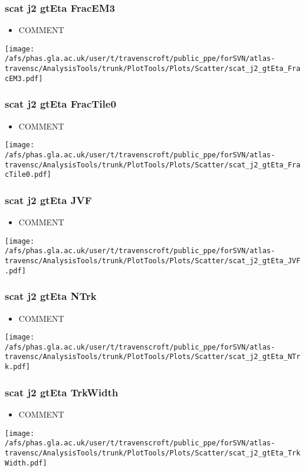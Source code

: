 \documentclass{beamer}
\begin{document}
\begin{frame}
\frametitle{scat j2 gtEta FracEM3}
\begin{itemize}
\item COMMENT
\end{itemize}
\begin{center}
\texttt{[image: /afs/phas.gla.ac.uk/user/t/travenscroft/public\_ppe/forSVN/atlas-travensc/AnalysisTools/trunk/PlotTools/Plots/Scatter/scat\_j2\_gtEta\_FracEM3.pdf]}
\end{center}
\end{frame}

\begin{frame}
\frametitle{scat j2 gtEta FracTile0}
\begin{itemize}
\item COMMENT
\end{itemize}
\begin{center}
\texttt{[image: /afs/phas.gla.ac.uk/user/t/travenscroft/public\_ppe/forSVN/atlas-travensc/AnalysisTools/trunk/PlotTools/Plots/Scatter/scat\_j2\_gtEta\_FracTile0.pdf]}
\end{center}
\end{frame}

\begin{frame}
\frametitle{scat j2 gtEta JVF}
\begin{itemize}
\item COMMENT
\end{itemize}
\begin{center}
\texttt{[image: /afs/phas.gla.ac.uk/user/t/travenscroft/public\_ppe/forSVN/atlas-travensc/AnalysisTools/trunk/PlotTools/Plots/Scatter/scat\_j2\_gtEta\_JVF.pdf]}
\end{center}
\end{frame}

\begin{frame}
\frametitle{scat j2 gtEta NTrk}
\begin{itemize}
\item COMMENT
\end{itemize}
\begin{center}
\texttt{[image: /afs/phas.gla.ac.uk/user/t/travenscroft/public\_ppe/forSVN/atlas-travensc/AnalysisTools/trunk/PlotTools/Plots/Scatter/scat\_j2\_gtEta\_NTrk.pdf]}
\end{center}
\end{frame}

\begin{frame}
\frametitle{scat j2 gtEta TrkWidth}
\begin{itemize}
\item COMMENT
\end{itemize}
\begin{center}
\texttt{[image: /afs/phas.gla.ac.uk/user/t/travenscroft/public\_ppe/forSVN/atlas-travensc/AnalysisTools/trunk/PlotTools/Plots/Scatter/scat\_j2\_gtEta\_TrkWidth.pdf]}
\end{center}
\end{frame}
\end{document}
